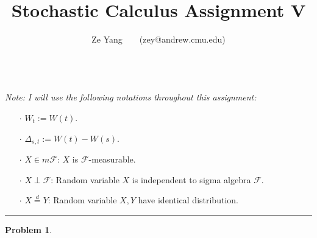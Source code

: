 \documentclass[a4paper, 10pt]{article}
\title{\textbf{Stochastic Calculus Assignment V}}
\author{Ze Yang~~~~(zey@andrew.cmu.edu)}
\theoremstyle{definition}
\newtheorem{problem}{Problem}
\theoremstyle{hSol}
\begin{document}
\maketitle

~\\
\textit{Note:} \textit{I will use the following notations throughout this assignment:}
\begin{itemize}
	\item[$\cdot$] $W_t := W(t)$.
	\item[$\cdot$] $\Delta_{s,t} := W(t) - W(s)$.
	\item[$\cdot$] $X\in m \mathcal{F}$: $X$ is $\mathcal{F}$-measurable.
	\item[$\cdot$] $X\perp \mathcal{F}$: Random variable $X$ is independent to sigma algebra $\mathcal{F}$. 
	\item[$\cdot$] $X\stackrel{d}{=} Y$: Random variable $X,Y$ have identical distribution.
\end{itemize}
\noindent\rule{16cm}{0.4pt}
\begin{problem}
\end{problem}
\end{document}
